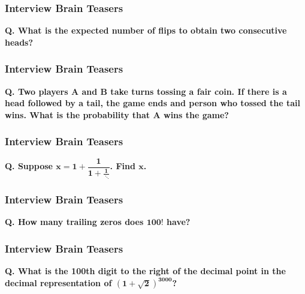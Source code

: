 \documentclass{beamer}
\begin{document}
\begin{frame}[t]
\frametitle{Interview Brain Teasers}
{\bf Q. What is the expected number of flips to obtain two consecutive heads?}

\end{frame}

\begin{frame}[t]
\frametitle{Interview Brain Teasers}
{\bf Q. Two players A and B take turns tossing a fair coin. If there is a head followed by a tail, the game ends and person who tossed the tail wins. What is the probability that A wins the game?}

\end{frame}

\begin{frame}[t]
\frametitle{Interview Brain Teasers}
{\bf Q. Suppose $\boldsymbol{ x = 1 + \dfrac{1}{1 + \frac{1}{\; \ddots}}}$. Find $\boldsymbol{x}$.}

\end{frame}

\begin{frame}[t]
\frametitle{Interview Brain Teasers}
{\bf Q. How many trailing zeros does $\boldsymbol{100!}$ have?}

\end{frame}


\begin{frame}[t]
\frametitle{Interview Brain Teasers}
{\bf Q. What is the 100th digit to the right of the decimal point in the decimal representation of $\boldsymbol{(1 + \sqrt{2})^{3000}}$?}

\end{frame}
\end{document}
